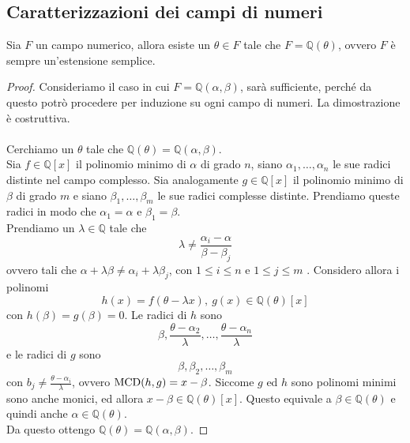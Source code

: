 \subsection{Caratterizzazioni dei campi di numeri}
\begin{teorema}
	Sia $F$ un campo numerico, allora esiste un $\theta\in F$ tale che $F=\mathbb{Q}(\theta)$, ovvero $F$ è sempre un'estensione semplice.
\end{teorema}
\begin{proof}
	Consideriamo il caso in cui $F=\mathbb{Q}(\alpha,\beta)$, sarà sufficiente, perché da questo potrò procedere per induzione su ogni campo di numeri. La dimostrazione è costruttiva. \\ \\ 
	Cerchiamo un $\theta$ tale che $\mathbb{Q}(\theta)=\mathbb{Q}(\alpha,\beta)$. \\ Sia $f\in\mathbb{Q}[x]$ il polinomio minimo di $\alpha$ di grado $n$, siano $\alpha_1,\dots,\alpha_n$ le sue radici distinte nel campo complesso. Sia analogamente $g\in\mathbb{Q}[x]$ il polinomio minimo di $\beta$ di grado $m$ e siano $\beta_1,\dots,\beta_m$ le sue radici complesse distinte. Prendiamo queste radici in modo che $\alpha_1=\alpha$ e $\beta_1=\beta$.\\ Prendiamo un $\lambda\in\mathbb{Q}$ tale che 
	\begin{equation*}
	\lambda\neq\frac{\alpha_i-\alpha}{\beta-\beta_j}
	\end{equation*}
	ovvero tali che $\alpha+\lambda\beta\neq\alpha_i+\lambda\beta_j$, con $1\leq i\leq n$ e $1\leq j\leq m$ . Considero allora i polinomi
	\begin{equation*}
	h(x)=f\left(\theta-\lambda x\right), \ g(x)\in\mathbb{Q}(\theta)[x]
	\end{equation*}
	con $h(\beta)=g(\beta)=0$. Le radici di $h$ sono 
	\begin{equation*}
	\beta, \frac{\theta-\alpha_2}{\lambda},\dots,\frac{\theta-\alpha_n}{\lambda}
	\end{equation*}
	e le radici di $g$ sono
	\begin{equation*}
	\beta, \beta_2, \dots, \beta_m
	\end{equation*}
	con $b_j\neq\frac{\theta-\alpha_i}{\lambda}$, ovvero $\operatorname{\mathrm{MCD}}(h,g)=x-\beta$. Siccome $g$ ed $h$ sono polinomi minimi sono anche monici, ed allora $x-\beta\in\mathbb{Q}(\theta)[x]$. Questo equivale a $\beta\in\mathbb{Q}(\theta)$ e quindi anche $\alpha\in\mathbb{Q}(\theta)$.\\ Da questo ottengo $\mathbb{Q}(\theta) = \mathbb{Q}(\alpha,\beta)$.
\end{proof}
